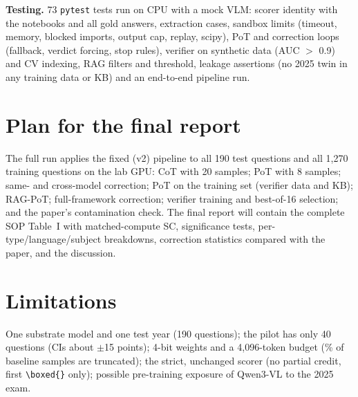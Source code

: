 \documentclass[conference]{IEEEtran}
\begin{document}
\textbf{Testing.} 73 \texttt{pytest} tests run on CPU with a mock VLM: scorer identity with the
notebooks and all gold answers, extraction cases, sandbox limits (timeout, memory, blocked
imports, output cap, replay, scipy), PoT and correction loops (fallback, verdict forcing, stop
rules), verifier on synthetic data (AUC $>$ 0.9) and CV indexing, RAG filters and threshold,
leakage assertions (no 2025 twin in any training data or KB) and an end-to-end pipeline run.

\section{Plan for the final report}\label{sec:plan}
The full run applies the fixed (v2) pipeline to all 190 test questions and all 1{,}270 training
questions on the lab GPU: CoT with 20 samples; PoT with 8 samples; same- and cross-model
correction; PoT on the training set (verifier data and KB); RAG-PoT; full-framework correction;
verifier training and best-of-16 selection; and the paper's contamination check. The final
report will contain the complete SOP Table~I with matched-compute SC, significance tests,
per-type/language/subject breakdowns, correction statistics compared with the paper, and the
discussion.

\section{Limitations}
One substrate model and one test year (190 questions); the pilot has only 40 questions (CIs
about $\pm$15 points); 4-bit weights and a 4{,}096-token budget (\BaseTrunc\% of baseline samples
are truncated); the strict, unchanged scorer (no partial credit, first \verb|\boxed{}| only);
possible pre-training exposure of Qwen3-VL to the 2025 exam.
\end{document}
